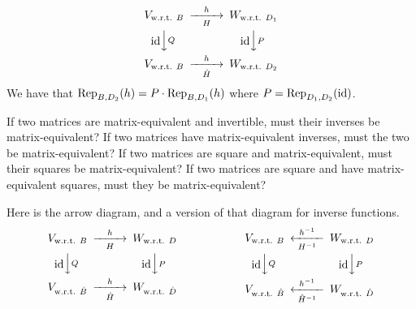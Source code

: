 \begin{exercises}
\begin{answer}
\begin{exparts}
           \begin{equation*}
             \begin{CD}
               V_\wrt{B}                   @>h>H>   W_\wrt{D_1}       \\
               @V\scriptstyle\identity VQV      @V\scriptstyle\identity VPV \\
               V_\wrt{B}             @>h>\hat{H}>  W_\wrt{D_2}
             \end{CD}
           \end{equation*}
           We have that \( \rep{h}{B,D_2}=P\cdot \rep{h}{B,D_1} \) where
           \( P=\rep{\identity}{D_1,D_2} \).
       \end{exparts}  
      \end{answer}
  \item 
    \begin{exparts}
      \partsitem If two matrices are matrix-equivalent and invertible,
        must their
        inverses be matrix-equivalent?
      \partsitem If two matrices have matrix-equivalent inverses, must the two
        be matrix-equivalent?
      \partsitem If two matrices are square and matrix-equivalent, must their
        squares be matrix-equivalent?
      \partsitem If two matrices are square and have matrix-equivalent squares,
        must they be matrix-equivalent?
    \end{exparts}
    \begin{answer}
      \begin{exparts}
        \partsitem Here is the arrow diagram, and a version of that diagram
          for inverse functions.
          \begin{equation*}
           \begin{CD}
             V_\wrt{B}                   @>h>H>      W_\wrt{D}       \\
             @V\scriptstyle\identity VQV       @V\scriptstyle\identity VPV \\
             V_\wrt{\hat{B}}             @>h>\hat{H}> W_\wrt{\hat{D}}
            \end{CD}
            \hspace*{4em}\qquad
           \begin{CD}
             V_\wrt{B}              @<h^{-1}<H^{-1}<    W_\wrt{D}       \\
             @V\scriptstyle\identity VQV       @V\scriptstyle\identity VPV \\
             V_\wrt{\hat{B}}        @<h^{-1}<\hat{H}^{-1}< W_\wrt{\hat{D}}

\end{CD}
\end{equation*}
\end{exparts}
\end{answer}
\end{exercises}
